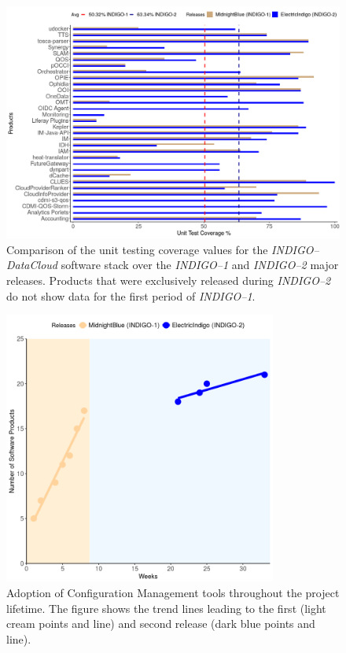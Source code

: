 \begin{figure}[ht]
\centering
\includegraphics[width=\textwidth]{images/fig2.png}
\caption{Comparison of the unit testing coverage values for the {\sl INDIGO--DataCloud}
software stack over the {\sl INDIGO--1} and {\sl INDIGO--2} major releases. Products that
were exclusively released during {\sl INDIGO--2} do not show data for the first period of
{\sl INDIGO--1}.}
\label{fig:fig_unittest}
\end{figure}

\begin{figure}[ht]
\centering
\includegraphics[width=0.8\textwidth]{images/fig3.png}
\caption{Adoption of Configuration Management tools throughout the project lifetime. The figure shows the trend lines
leading to the first (light cream points and line) and second release (dark blue points and line).}
\label{fig:fig_confman}
\end{figure}

